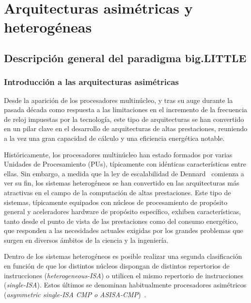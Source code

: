 \cleardoublepage

\chapter{Arquitecturas asimétricas y heterogéneas}
\label{ch:chapter2}

\section{Descripción general del paradigma big.LITTLE}

\subsection{Introducción a las arquitecturas asimétricas}
\label{sec:arch_asym}

Desde la aparición de los procesadores multinúcleo, y tras su auge durante
la pasada década como respuesta a las limitaciones en el incremento de la
frecuencia de reloj impuestas por la tecnología, este tipo de arquitecturas
se han convertido en un pilar clave en el desarrollo de arquitecturas de
altas prestaciones, reuniendo a la vez una gran capacidad de cálculo y una
eficiencia energética notable.

Históricamente, los procesadores multinúcleo han estado formados por varias
Unidades de Procesamiento (PUs), típicamente con idénticas características
entre ellas.  Sin embargo, a medida que la ley de escalabilidad de
Dennard~\cite{Den74} comienza a ver su fin, los sistemas heterogéneos se
han convertido en las arquitecturas más atractivas en el campo de la
computación de altas prestaciones. Este tipo de sistemas, típicamente
equipados con núcleos de procesamiento de propósito general y aceleradores
hardware de propósito específico, exhiben características, tanto desde el
punto de vista de las prestaciones como del consumo energético, que
responden a las necesidades actuales exigidas por los grandes problemas que
surgen en diversos ámbitos de la ciencia y la ingeniería.

Dentro de los sistemas heterogéneos es posible realizar una segunda
clasificación en función de que los distintos núcleos dispongan de
distintos repertorios de instrucciones ({\em heterogeneous-ISA}) o utilicen
el mismo repertorio de instrucciones ({\em single-ISA}). Estos últimos se
denominan habitualmente procesadores asimétricos ({\em asymmetric
  single-ISA CMP o ASISA-CMP})~\cite{survey_asym}.

